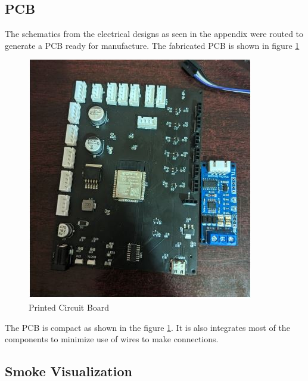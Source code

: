 \subsection{PCB}
The schematics from the electrical designs as seen in the appendix were routed to generate a PCB ready for manufacture. The fabricated PCB is shown in figure \ref{fig:pcb_fab}
\begin{center}
	\begin{figure}[H]
		\centering
		\includegraphics[width=0.7\linewidth]{Figures/pcb 1.JPG}
		\caption[Printed Circuit Board view]{Printed Circuit Board}
		\label{fig:pcb_fab}
	\end{figure}
\end{center}
The PCB is compact as shown in the figure \ref{fig:pcb_fab}. It is also integrates most of the components to minimize use of wires to make connections.

\subsection{Smoke Visualization}
